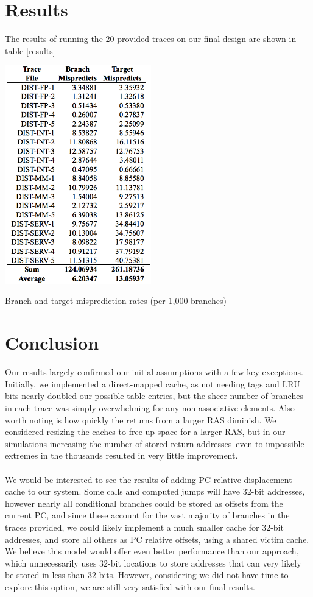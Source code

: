 \documentclass[twocolumn]{article}
\newcommand{\centertable}[3]{
\begin{table}[ht!]  
\begin{center} #1
\caption{#2}
\label{#3}
\end{center}
\end{table}}
\begin{document}
\section{Results}
The results of running the 20 provided traces on our final design are shown in table \ref{results}
\centertable{\includegraphics[width=2.5in]{img/results.png}}{Branch and target misprediction rates (per 1,000 branches)}{results}

\section{Conclusion}
Our results largely confirmed our initial assumptions with a few key exceptions. Initially, we implemented a direct-mapped cache, as not needing tags and LRU bits nearly doubled our possible table entries, but the sheer number of branches in each trace was simply overwhelming for any non-associative elements.  Also worth noting is how quickly the returns from a larger RAS diminish.  We considered resizing the caches to free up space for a larger RAS, but in our simulations increasing the number of stored return addresses--even to impossible extremes in the thousands resulted in very little improvement.\\\\
We would be interested to see the results of adding PC-relative displacement cache to our system.  Some calls and computed jumps will have 32-bit addresses, however nearly all conditional branches could be stored as offsets from the current PC, and since these account for the vast majority of branches in the traces provided, we could likely implement a much smaller cache for 32-bit addresses, and store all others as PC relative offsets, using a shared victim cache. We believe this model would offer even better performance than our approach, which unnecessarily uses 32-bit locations to store addresses that can very likely be stored in less than 32-bits.  However, considering we did not have time to explore this option, we are still very satisfied with our final results. 
\appendix
\onecolumn
\end{document}
